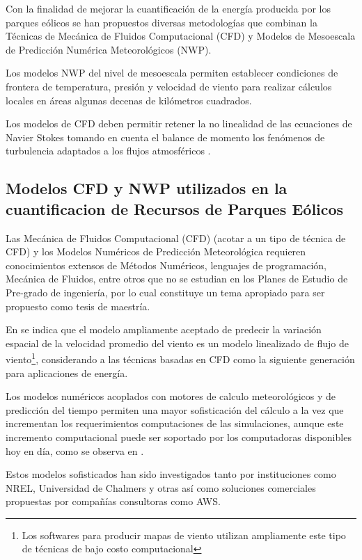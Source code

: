 Con la finalidad de mejorar la cuantificación de la energía producida por los parques eólicos se han propuestos diversas metodologías que combinan la Técnicas de Mecánica de Fluidos Computacional (CFD) y Modelos de Mesoescala de Predicción Numérica  Meteorológicos (NWP). 

Los modelos NWP del nivel de mesoescala permiten establecer condiciones de frontera de temperatura, presión y velocidad de viento para realizar cálculos locales en áreas algunas decenas de kilómetros cuadrados. 

Los modelos de CFD deben permitir retener la no linealidad de las ecuaciones de Navier Stokes tomando en cuenta el balance de momento los fenómenos de turbulencia adaptados a los flujos atmosféricos \citep{sanz_state---art_2010}. 


\subsection{Modelos CFD y NWP utilizados en la cuantificacion de Recursos de Parques Eólicos}

Las Mecánica  de Fluidos Computacional (CFD) (acotar a un tipo de técnica de CFD) y los Modelos Numéricos de Predicción Meteorológica requieren conocimientos extensos de Métodos Numéricos, lenguajes de programación, Mecánica de Fluidos, entre otros que no se estudian en los Planes de Estudio de Pre-grado de ingeniería, por lo cual constituye un tema apropiado para ser propuesto como tesis de maestría.

En \citep{beaucage_more_????} se indica que el modelo ampliamente aceptado de predecir la variación espacial de la velocidad promedio del viento es un modelo linealizado de flujo de viento\footnote{Los softwares para producir mapas de viento utilizan ampliamente este tipo de técnicas de bajo costo computacional}, considerando a las técnicas basadas en CFD como la siguiente generación para aplicaciones de energía. 

Los modelos numéricos acoplados con motores de calculo meteorológicos y de predicción del tiempo permiten una mayor sofisticación del cálculo a la vez que incrementan los requerimientos computaciones de las simulaciones, aunque este incremento computacional puede ser soportado por los computadoras disponibles hoy en día, como se observa en \citep*{zajaczkowski_preliminary_2011}. 

Estos modelos sofisticados han sido investigados tanto por instituciones como NREL, Universidad de Chalmers y otras así como soluciones comerciales propuestas por compañías consultoras como AWS. 


